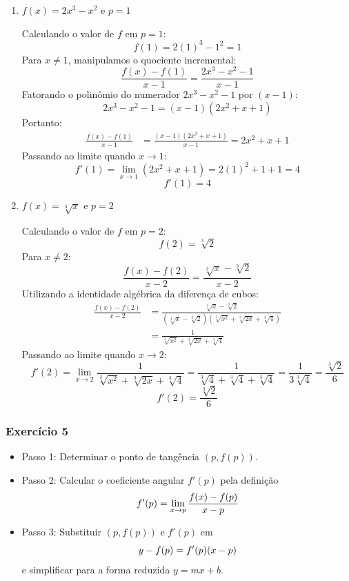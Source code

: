 \begin{enumerate}[label=\alph*)]
    \item $f(x) = 2x^3 - x^2$ e $p = 1$

    Calculando o valor de $f$ em $p = 1$:
    \[
    f(1) = 2(1)^3 - 1^2 = 1
    \]
    Para $x \neq 1$, manipulamos o quociente incremental:
    \[
    \frac{f(x) - f(1)}{x - 1} = \frac{2x^3 - x^2 - 1}{x - 1}
    \]
    Fatorando o polinômio do numerador $2x^3 - x^2 - 1$ por $(x - 1)$:
    \[
    2x^3 - x^2 - 1 = (x - 1)(2x^2 + x + 1)
    \]
    Portanto:
    \begin{align*}
        \frac{f(x) - f(1)}{x - 1} &= \frac{(x - 1)(2x^2 + x + 1)}{x - 1} = 2x^2 + x + 1
    \end{align*}
    Passando ao limite quando $x \to 1$:
    \[
    f'(1) = \lim_{x \to 1} (2x^2 + x + 1) = 2(1)^2 + 1 + 1 = 4
    \]
    \[
    f'(1) = 4
    \]

    \item $f(x) = \sqrt[3]{x}$ e $p = 2$

    Calculando o valor de $f$ em $p = 2$:
    \[
    f(2) = \sqrt[3]{2}
    \]
    Para $x \neq 2$:
    \[
    \frac{f(x) - f(2)}{x - 2} = \frac{\sqrt[3]{x} - \sqrt[3]{2}}{x - 2}
    \]
    Utilizando a identidade algébrica da diferença de cubos:
    \begin{align*}
        \frac{f(x) - f(2)}{x - 2} &= \frac{\sqrt[3]{x} - \sqrt[3]{2}}{(\sqrt[3]{x} - \sqrt[3]{2})\left(\sqrt[3]{x^2} + \sqrt[3]{2x} + \sqrt[3]{4}\right)} \\[0.20cm]
        &= \frac{1}{\sqrt[3]{x^2} + \sqrt[3]{2x} + \sqrt[3]{4}}
    \end{align*}
    Passando ao limite quando $x \to 2$:
    \[
    f'(2) = \lim_{x \to 2} \frac{1}{\sqrt[3]{x^2} + \sqrt[3]{2x} + \sqrt[3]{4}} = \frac{1}{\sqrt[3]{4} + \sqrt[3]{4} + \sqrt[3]{4}} = \frac{1}{3\sqrt[3]{4}} = \frac{\sqrt[3]{2}}{6}
    \]
    \[
    f'(2) = \frac{\sqrt[3]{2}}{6}
    \]
\end{enumerate}

\vspace{0.6cm}
\subsubsection*{Exercício 5}

\begin{estrategiabox}
  \begin{itemize}[noitemsep, topsep=2pt]
    \item Passo 1: Determinar o ponto de tangência $(p, f(p))$.
    \item Passo 2: Calcular o coeficiente angular $f'(p)$ pela definição \[f'(p) = \lim_{x \to p} \frac{f(x) - f(p)}{x - p}\]
    \item Passo 3: Substituir $(p, f(p))$ e $f'(p)$ em \[y - f(p) = f'(p)(x - p)\] e simplificar para a forma reduzida $y = mx + b$.
  \end{itemize}
\end{estrategiabox}

